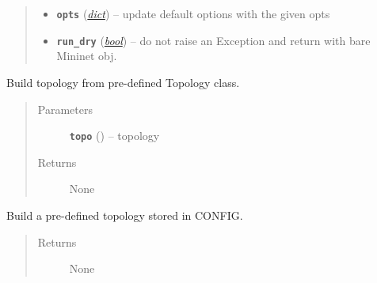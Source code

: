 \documentclass[letterpaper,10pt,english]{sphinxmanual}
\begin{document}
\begin{fulllineitems}
\begin{fulllineitems}
\begin{quote}
\begin{description}
\begin{itemize}
\item {} 
\textbf{\texttt{opts}} (\href{https://docs.python.org/2.7/library/stdtypes.html\#dict}{\emph{dict}}) -- update default options with the given opts

\item {} 
\textbf{\texttt{run\_dry}} (\href{https://docs.python.org/2.7/library/functions.html\#bool}{\emph{bool}}) -- do not raise an Exception and return with bare Mininet obj.

\end{itemize}

\end{description}\end{quote}

\end{fulllineitems}


\begin{fulllineitems}
\label{infr/topology:escape.infr.topology.ESCAPENetworkBuilder._ESCAPENetworkBuilder__init_from_AbstractTopology}
Build topology from pre-defined Topology class.
\begin{quote}\begin{description}
\item[{Parameters}] \leavevmode
\textbf{\texttt{topo}} ({\hyperref[infr/topology:escape.infr.topology.AbstractTopology]{\emph{}}}) -- topology

\item[{Returns}] \leavevmode
None

\end{description}\end{quote}

\end{fulllineitems}


\begin{fulllineitems}
\label{infr/topology:escape.infr.topology.ESCAPENetworkBuilder._ESCAPENetworkBuilder__init_from_CONFIG}
Build a pre-defined topology stored in CONFIG.
\begin{quote}\begin{description}
\item[{Returns}] \leavevmode
None


\end{description}
\end{quote}
\end{fulllineitems}
\end{fulllineitems}
\end{document}
